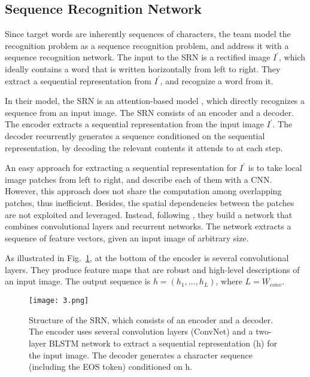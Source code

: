 \documentclass[10pt,twocolumn,letterpaper]{article}
\begin{document}
\subsection{Sequence Recognition Network}

Since target words are inherently sequences of characters, the team model the recognition problem as a sequence recognition problem, and address it with a sequence recognition network. The input to the SRN is a rectified image $I^\prime$, which ideally contains a word that is written horizontally from left to right. They extract a sequential representation from $I^\prime$, and recognize a word from it.

In their model, the SRN is an attention-based model \cite{bahdanau2014neural}, which directly recognizes a sequence from an input image. The SRN consists of an encoder and a decoder. The encoder extracts a sequential representation from the input image $I^\prime$. The decoder recurrently generates a sequence conditioned on the sequential representation, by decoding the relevant contents it attends to at each step.

An easy approach for extracting a sequential representation for $I^\prime$ is to take local image patches from left to right, and describe each of them with a CNN. However, this approach does not share the computation among overlapping patches, thus inefficient. Besides, the spatial dependencies between the patches are not exploited and leveraged. Instead, following \cite{shi2017end}, they build a network that combines convolutional layers and recurrent networks. The network extracts a sequence of feature vectors, given an input image of arbitrary size.

As illustrated in Fig.~\ref{fig:3}, at the bottom of the encoder is several convolutional layers. They produce feature maps that are robust and high-level descriptions of an input image. The output sequence is $h = (h_1,\dots,h_L)$, where $L = W_{conv}$.

\begin{figure}
	\begin{center}
		\texttt{[image: 3.png]}
	\end{center}
	\caption{Structure of the SRN, which consists of an encoder and a decoder. The encoder uses several convolution layers (ConvNet) and a two-layer BLSTM network to extract a sequential representation (h) for the input image. The decoder generates a character sequence (including the EOS token) conditioned on h.}
	\label{fig:3}
\end{figure}
\end{document}
